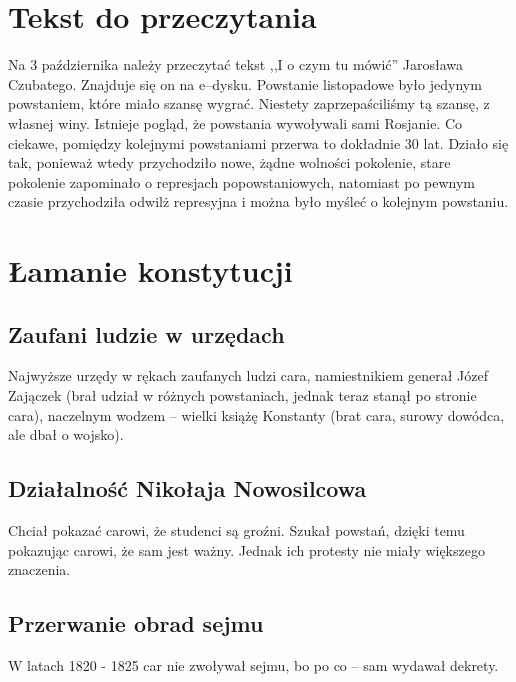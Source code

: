 \documentclass [a4paper, 11pt, oneside]{book}
\begin{document}
    \section{Tekst do przeczytania} %
    \label{sec:tekst_do_przeczytania}
        Na 3 października należy przeczytać tekst ,,I o czym tu mówić'' Jarosława Czubatego. Znajduje się on na e--dysku.
    Powstanie listopadowe było jedynym powstaniem, które miało szansę wygrać. Niestety zaprzepaściliśmy tą szansę, z własnej winy. Istnieje pogląd, że powstania wywoływali sami Rosjanie. Co ciekawe, pomiędzy kolejnymi powstaniami przerwa to dokładnie 30 lat. Działo się tak, ponieważ wtedy przychodziło nowe, żądne wolności pokolenie, stare pokolenie zapominało o represjach popowstaniowych, natomiast po pewnym czasie przychodziła odwilż represyjna i można było myśleć o kolejnym powstaniu.
    \section{Łamanie konstytucji} %
    \label{sec:_amanie_konstytucji}
        \subsection{Zaufani ludzie w urzędach} %
        \label{sub:zaufani_ludzie_w_urz_dach}
            Najwyższe urzędy w rękach zaufanych ludzi cara, namiestnikiem generał Józef Zajączek (brał udział w różnych powstaniach, jednak teraz stanął po stronie cara), naczelnym wodzem -- wielki książę Konstanty (brat cara, surowy dowódca, ale dbał o wojsko).
        \subsection{Działalność Nikołaja Nowosilcowa} %
        \label{sub:dzia_alno_niko_aja_nowosilcowa}
            Chciał pokazać carowi, że studenci są groźni. Szukał powstań, dzięki temu pokazując carowi, że sam jest ważny. Jednak ich protesty nie miały większego znaczenia.
        \subsection{Przerwanie obrad sejmu} %
        \label{sub:przerwanie_obrad_sejmu}
            W latach 1820 - 1825 car nie zwoływał sejmu, bo po co -- sam wydawał dekrety.
\end{document}
